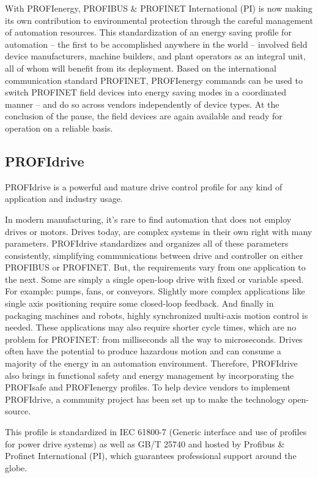 \documentclass[conference]{IEEEtran}
\begin{document}
With PROFIenergy, PROFIBUS \& PROFINET International (PI) is now making its own contribution to environmental protection through the careful management of automation resources. This standardization of an energy saving profile for automation – the first to be accomplished anywhere in the world – involved field device manufacturers, machine builders, and plant operators as an integral unit, all of whom will benefit from its deployment. Based on the international communication standard PROFINET, PROFIenergy commands can be used to switch PROFINET field devices into energy saving modes in a coordinated manner – and do so across vendors independently of device types. At the conclusion of the pause, the field devices are again available and ready for operation on a reliable basis.

\subsection{PROFIdrive}
\label{subsec: PROFIdrive}
PROFIdrive is a powerful and mature drive control profile for any kind of application and industry usage.

In modern  manufacturing, it's rare to find automation that does not employ drives or motors. Drives  today, are complex systems in their own right with many parameters. PROFIdrive standardizes and  organizes all of these parameters consistently, simplifying communications between drive and  controller on either PROFIBUS or PROFINET. But, the requirements vary from one application  to the next. Some are simply a single open-loop drive with fixed or variable speed. For example:  pumps, fans, or conveyors. Slightly more complex applications like single axis positioning  require some closed-loop feedback. And finally in packaging machines and robots, highly  synchronized multi-axis motion control is needed. These applications may also require shorter  cycle times, which are no problem for PROFINET: from milliseconds all the way to microseconds.  Drives often have the potential to produce hazardous motion and can consume a majority of the  energy in an automation environment. Therefore, PROFIdrive also brings in functional safety  and energy management by incorporating the PROFIsafe and PROFIenergy profiles. To help  device vendors to implement PROFIdrive, a community project has been set up  to make the technology open-source.

This profile is standardized in IEC 61800-7 (Generic interface and use of profiles for power drive systems) as well as GB/T 25740 and hosted by Profibus \& Profinet International (PI), which guarantees professional support around the globe.
\end{document}
